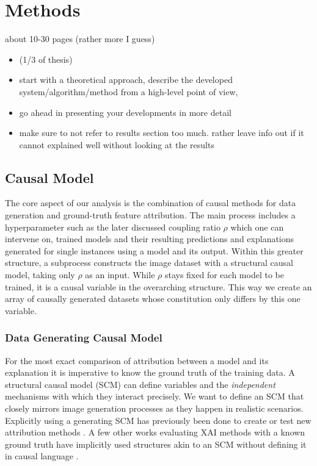 \chapter{Methods}\label{chapter:method}

{ \color{red}

    about 10-30 pages (rather more I guess)

    \begin{itemize}
        \item (1/3 of thesis)
        \item start with a theoretical approach, describe the developed system/algorithm/method from a high-level point of view,
        \item go ahead in presenting your developments in more detail
        \item make sure to not refer to results section too much. rather leave info out if it cannot explained well without looking at the results
    \end{itemize}
}

\section{Causal Model}
The core aspect of our analysis is the combination of causal methods for data generation and ground-truth feature attribution. 
The main process includes a hyperparameter such as the later discussed coupling ratio $\rho$ which one can intervene on, trained models and their resulting predictions and explanations generated for single instances using a model and its output. 
Within this greater structure, a subprocess constructs the image dataset with a structural causal model, taking only $\rho$ as an input. While $\rho$ stays fixed for each model to be trained, it is a causal variable in the overarching structure. This way we create an array of causally generated datasets whose constitution only differs by this one variable. 

\subsection{Data Generating Causal Model}
For the most exact comparison of attribution between a model and its explanation it is imperative to know the ground truth of the training data. A structural causal model (SCM) can define variables and the \textit{independent} mechanisms with which they interact precisely. We want to define an SCM that closely mirrors image generation processes as they happen in realistic scenarios. 
Explicitly using a generating SCM has previously been done to create or test new attribution methods \cite{Parafita2019, Wilming2023, Clark2023, Goyal2019, Reimers2019, Reimers2020}. A few other works evaluating XAI methods with a known ground truth have implicitly used structures akin to an SCM without defining it in causal language \cite{Kim2018, Yang2019, Arras2022}. 

